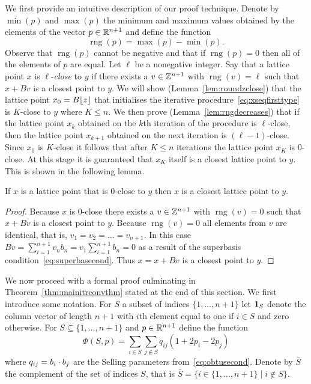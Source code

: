 \documentclass[final,leqno]{siamltex}
\begin{document}
\newcommand{\rng}{\operatorname{rng}}

We first provide an intuitive description of our proof technique.  Denote by $\min(p)$ and $\max(p)$ the minimum and maximum values obtained by the elements of the vector $p \in {\mathbb R}^{n+1}$ and define the function
\[
\rng(p) = \max(p) - \min(p).
\] 
Observe that $\rng(p)$ cannot be negative and that if $\rng(p) = 0$ then all of the elements of $p$ are equal.  Let $\ell$ be a nonegative integer.  Say that a lattice point $x$ is $\ell$-\emph{close} to $y$ if there exists a $v \in {\mathbb Z}^{n+1}$ with $\rng(v) = \ell$ such that $x + Bv$ is a closest point to $y$.  We will show (Lemma~\ref{lem:roundzclose}) that the lattice point $x_0 = B{\left\lfloor z \right\rfloor}$ that initialises the iterative procedure~\eqref{eq:xseqfirsttype} is $K$-close to $y$ where $K \leq n$.  We then prove (Lemma~\ref{lem:rngdecreases}) that if the lattice point $x_k$ obtained on the $k$th iteration of the procedure is $\ell$-close, then the lattice point $x_{k+1}$ obtained on the next iteration is $(\ell-1)$-close.  Since $x_0$ is $K$-close it follows that after $K \leq n$ iterations the lattice point $x_K$ is $0$-close.  At this stage it is guaranteed that $x_{K}$ itself is a closest lattice point to $y$.  This is shown in the following lemma.

\begin{lemma}\label{lem:rngzeroclosestpoint}
If $x$ is a lattice point that is $0$-close to $y$ then $x$ is a closest lattice point to $y$.
\end{lemma}
\begin{proof}
Because $x$ is $0$-close there exists a $v \in {\mathbb Z}^{n+1}$ with $\rng(v) = 0$ such that $x + Bv$ is a closest point to $y$.  Because $\rng(v) = 0$ all elements from $v$ are identical, that is, $v_1=v_2=\dots=v_{n+1}$.  In this case $Bv = \sum_{i=1}^{n+1} v_n b_n = v_1\sum_{i=1}^{n+1}b_n = 0$
as a result of the superbasis condition~\eqref{eq:superbasecond}.  Thus $x = x + Bv$ is a closest point to $y$. 
\end{proof}

\newcommand{\subrng}{\operatorname{subr}}
\newcommand{\decrng}{\operatorname{decrng}}

We now proceed with a formal proof culminating in Theorem~\ref{thm:mainitrconvthm} stated at the end of this section.  We first introduce some notation.  For $S$ a subset of indices $\{1,\dots,n+1\}$ let $\boldsymbol{1}_S$ denote the column vector of length $n+1$ with $i$th element equal to one if $i \in S$ and zero otherwise. %
For $S \subseteq \{1,\dots,n+1\}$ and $p \in {\mathbb R}^{n+1}$ define the function
\[
\Phi(S, p) = \sum_{i \in S}\sum_{j \notin S}q_{ij}(1 + 2p_i - 2p_j)
\]
where $q_{ij} = b_i \cdot b_j$ are the Selling parameters from~\eqref{eq:obtusecond}.  Denote by $\bar{S}$ the complement of the set of indices $S$, that is $\bar{S} = \{ i \in \{1,\dots,n+1\} \mid i \notin S\}$. 
\end{document}
